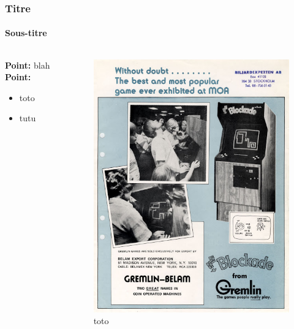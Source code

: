 \documentclass[10pt]{beamer}
\begin{document}
\begin{frame}
\frametitle{Titre}
\framesubtitle{Sous-titre}
\begin{columns}[T]
\begin{column}{0.70\textwidth}
\footnotesize
\textbf{Point:} blah
\vspace{0.5cm}
\textbf{Point:}
\begin{itemize}
\footnotesize
\item toto
\item tutu
\end{itemize}
\end{column}
\begin{column}{0.24\textwidth}
\begin{figure}
\centering
\vspace{-1cm}\hspace{-0.6cm}
\includegraphics[width=1\textwidth]{blockade.jpg}
\caption*{\tiny toto}
\end{figure}
\end{column}
\end{columns}
\end{frame}
\end{document}
